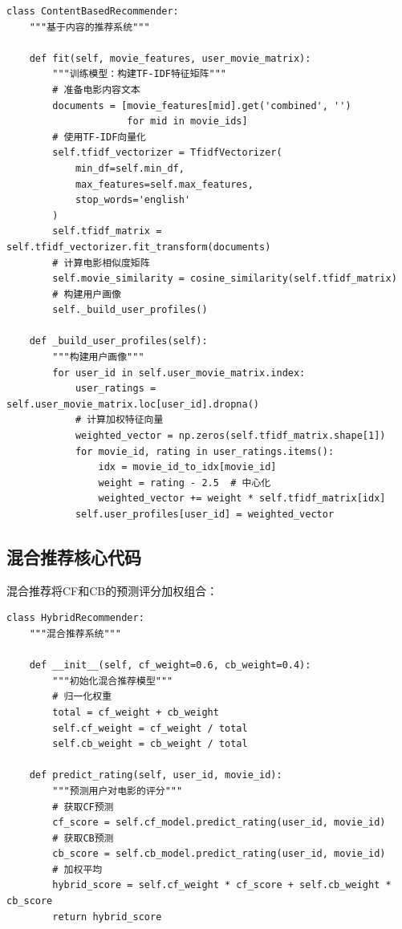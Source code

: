 \documentclass[a4paper]{article}
\begin{document}
\begin{lstlisting}
class ContentBasedRecommender:
    """基于内容的推荐系统"""
    
    def fit(self, movie_features, user_movie_matrix):
        """训练模型：构建TF-IDF特征矩阵"""
        # 准备电影内容文本
        documents = [movie_features[mid].get('combined', '') 
                     for mid in movie_ids]
        # 使用TF-IDF向量化
        self.tfidf_vectorizer = TfidfVectorizer(
            min_df=self.min_df,
            max_features=self.max_features,
            stop_words='english'
        )
        self.tfidf_matrix = self.tfidf_vectorizer.fit_transform(documents)
        # 计算电影相似度矩阵
        self.movie_similarity = cosine_similarity(self.tfidf_matrix)
        # 构建用户画像
        self._build_user_profiles()
    
    def _build_user_profiles(self):
        """构建用户画像"""
        for user_id in self.user_movie_matrix.index:
            user_ratings = self.user_movie_matrix.loc[user_id].dropna()
            # 计算加权特征向量
            weighted_vector = np.zeros(self.tfidf_matrix.shape[1])
            for movie_id, rating in user_ratings.items():
                idx = movie_id_to_idx[movie_id]
                weight = rating - 2.5  # 中心化
                weighted_vector += weight * self.tfidf_matrix[idx]
            self.user_profiles[user_id] = weighted_vector
\end{lstlisting}

\subsection{混合推荐核心代码}

混合推荐将CF和CB的预测评分加权组合：

\begin{lstlisting}
class HybridRecommender:
    """混合推荐系统"""
    
    def __init__(self, cf_weight=0.6, cb_weight=0.4):
        """初始化混合推荐模型"""
        # 归一化权重
        total = cf_weight + cb_weight
        self.cf_weight = cf_weight / total
        self.cb_weight = cb_weight / total
    
    def predict_rating(self, user_id, movie_id):
        """预测用户对电影的评分"""
        # 获取CF预测
        cf_score = self.cf_model.predict_rating(user_id, movie_id)
        # 获取CB预测
        cb_score = self.cb_model.predict_rating(user_id, movie_id)
        # 加权平均
        hybrid_score = self.cf_weight * cf_score + self.cb_weight * cb_score
        return hybrid_score
\end{lstlisting}
\end{document}
